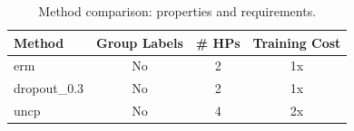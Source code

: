 \begin{table}[t]
\centering
\caption{Method comparison: properties and requirements.}
\label{tab:method_comparison}
\begin{tabular}{lccc}
\toprule
Method & Group Labels & \# HPs & Training Cost \\
\midrule
erm & No & 2 & 1x \\
dropout\_0.3 & No & 2 & 1x \\
uncp & No & 4 & 2x \\
\bottomrule
\end{tabular}
\end{table}